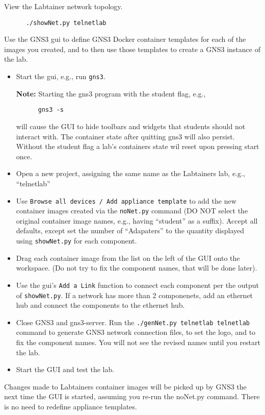 \documentclass[12pt]{article}
\begin{document}
View the Labtainer network topology.
\begin{verbatim}
      ./showNet.py telnetlab
\end{verbatim}
\noindent Use the GNS3 gui to define GNS3 Docker container templates for each of the 
images you created, and to then use those templates to create a GNS3 instance of 
the lab.
\begin{itemize}
	\item Start the gui, e.g., run {\tt gns3}.  
	
	{\bf Note:} Starting the gns3 program with the \-\-student flag, e.g., 
	\begin{verbatim}	
	  gns3 -s 
	\end{verbatim}		
	will cause the GUI to hide toolbars and widgets that students should not interact with. The container state after quitting gns3 will also persist. Without the student flag a lab's containers state wil reset upon pressing start once.
	\item Open a new project, assigning the same name as the Labtainers lab, e.g., ``telnetlab''
	\item Use {\tt Browse all devices / Add appliance template} to add the new container images created
		via the {\tt noNet.py} command (DO NOT select the original container image names, e.g., having ``student'' as a suffix).  
Accept all defaults, except set the number of ``Adapaters'' to
		the quantity displayed using {\tt showNet.py} for each component.
	\item Drag each container image from the list on the left of the GUI onto the workspace.  (Do not try to fix
		the component names, that will be done later).
	\item Use the gui's {\tt Add a Link} function to connect each component per the output of {\tt showNet.py}. If a network has more than 2 componenets, add an ethernet hub and connect the components to the ethernet hub.
	\item Close GNS3 and gns3-server. Run the {\tt ./genNet.py telnetlab telnetlab} command to generate GNS3 network connection files, to set the logo, and to
		fix the component names.  You will not see the revised names until you restart the lab.
	\item Start the GUI and test the lab.
\end{itemize}
Changes made to Labtainers container images will be picked up by GNS3 the next time the GUI is started,
assuming you re-run the noNet.py command.  There is no need to redefine appliance templates.
\end{document}
